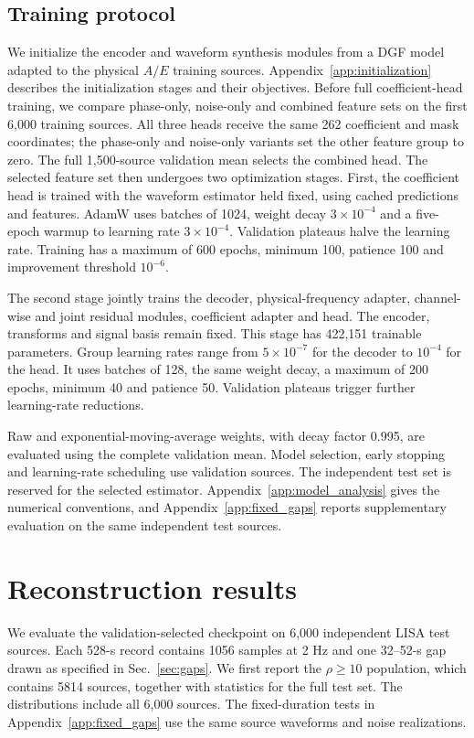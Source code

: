 \documentclass[10pt,prd,aps,a4paper,twocolumn,superscriptaddress,nofootinbib,floatfix]{revtex4-2}
\begin{document}
\subsection{Training protocol}\label{sec:training}
We initialize the encoder and waveform synthesis modules from a DGF model adapted to the physical $A/E$ training sources. Appendix~\ref{app:initialization} describes the initialization stages and their objectives. Before full coefficient-head training, we compare phase-only, noise-only and combined feature sets on the first 6,000 training sources. All three heads receive the same 262 coefficient and mask coordinates; the phase-only and noise-only variants set the other feature group to zero. The full 1,500-source validation mean selects the combined head. The selected feature set then undergoes two optimization stages. First, the coefficient head is trained with the waveform estimator held fixed, using cached predictions and features. AdamW uses batches of 1024, weight decay $3\times10^{-4}$ and a five-epoch warmup to learning rate $3\times10^{-4}$. Validation plateaus halve the learning rate. Training has a maximum of 600 epochs, minimum 100, patience 100 and improvement threshold $10^{-6}$.

The second stage jointly trains the decoder, physical-frequency adapter, channel-wise and joint residual modules, coefficient adapter and head. The encoder, transforms and signal basis remain fixed. This stage has 422,151 trainable parameters. Group learning rates range from $5\times10^{-7}$ for the decoder to $10^{-4}$ for the head. It uses batches of 128, the same weight decay, a maximum of 200 epochs, minimum 40 and patience 50. Validation plateaus trigger further learning-rate reductions.

Raw and exponential-moving-average weights, with decay factor 0.995, are evaluated using the complete validation mean. Model selection, early stopping and learning-rate scheduling use validation sources. The independent test set is reserved for the selected estimator. Appendix~\ref{app:model_analysis} gives the numerical conventions, and Appendix~\ref{app:fixed_gaps} reports supplementary evaluation on the same independent test sources.

\section{Reconstruction results}\label{sec:results}
We evaluate the validation-selected checkpoint on 6,000 independent LISA test sources. Each 528-s record contains 1056 samples at 2 Hz and one 32--52-s gap drawn as specified in Sec.~\ref{sec:gaps}. We first report the $\rho\ge10$ population, which contains 5814 sources, together with statistics for the full test set. The distributions include all 6,000 sources. The fixed-duration tests in Appendix~\ref{app:fixed_gaps} use the same source waveforms and noise realizations.
\end{document}
